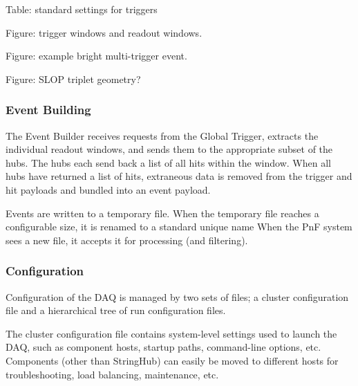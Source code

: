 
Table: standard settings for triggers

Figure: trigger windows and readout windows.

Figure: example bright multi-trigger event.

Figure: SLOP triplet geometry?

\subsubsection{Event Building}

The Event Builder receives requests from the Global Trigger, extracts
the individual readout windows, and sends them to the appropriate subset of the
hubs.  The hubs each send back a list of all hits within the window.  When all
hubs have returned a list of hits, extraneous data is removed from the trigger
and hit payloads and bundled into an event payload.

Events are written to a temporary file.  When the temporary
file reaches a configurable size, it is renamed to a standard unique name
When the PnF system sees a new file, it accepts it for
processing (and filtering).


\subsubsection{Configuration}

Configuration of the DAQ is managed by two sets of files; a cluster
configuration file and a hierarchical tree of run configuration files.

The cluster configuration file contains system-level settings used to launch
the DAQ, such as component hosts, startup paths, command-line options, etc.
Components
(other than StringHub) can easily be moved to different hosts for
troubleshooting, load balancing, maintenance, etc.

